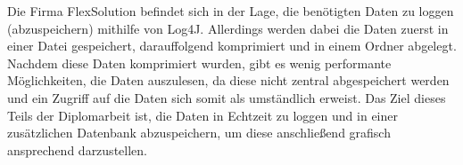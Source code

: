 Die Firma FlexSolution befindet sich in der Lage, die benötigten Daten zu loggen (abzuspeichern) mithilfe von Log4J. Allerdings werden dabei die Daten zuerst in einer Datei gespeichert, darauffolgend komprimiert und in einem Ordner abgelegt. Nachdem diese Daten komprimiert wurden, gibt es wenig performante Möglichkeiten, die Daten auszulesen, da diese nicht zentral abgespeichert werden und ein Zugriff auf die Daten sich somit als umständlich erweist. Das Ziel dieses Teils der Diplomarbeit ist, die Daten in Echtzeit zu loggen und in einer zusätzlichen Datenbank abzuspeichern, um diese anschließend grafisch ansprechend darzustellen.
 
